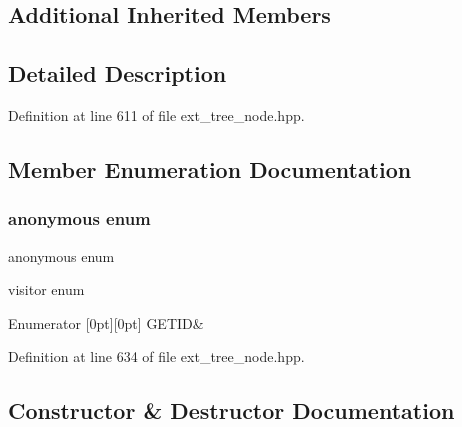 \subsection*{Additional Inherited Members}


\subsection{Detailed Description}


Definition at line 611 of file ext\+\_\+tree\+\_\+node.\+hpp.



\subsection{Member Enumeration Documentation}
\mbox{\label{structomp__simd__pragma_aad9fdd096726288087c584bfae74973e}} 
\subsubsection{\texorpdfstring{anonymous enum}{anonymous enum}}
{\footnotesize\ttfamily anonymous enum}



visitor enum 

\begin{DoxyEnumFields}{Enumerator}
[0pt][0pt]{}\mbox{\label{structomp__simd__pragma_aad9fdd096726288087c584bfae74973eac905e24af5925d314d16656796016ed6}} 
G\+E\+T\+ID&\\
\hline

\end{DoxyEnumFields}


Definition at line 634 of file ext\+\_\+tree\+\_\+node.\+hpp.



\subsection{Constructor \& Destructor Documentation}
\mbox{\label{structomp__simd__pragma_aa9e67505c60e8693724c18e7cc4f1c2d}} 
